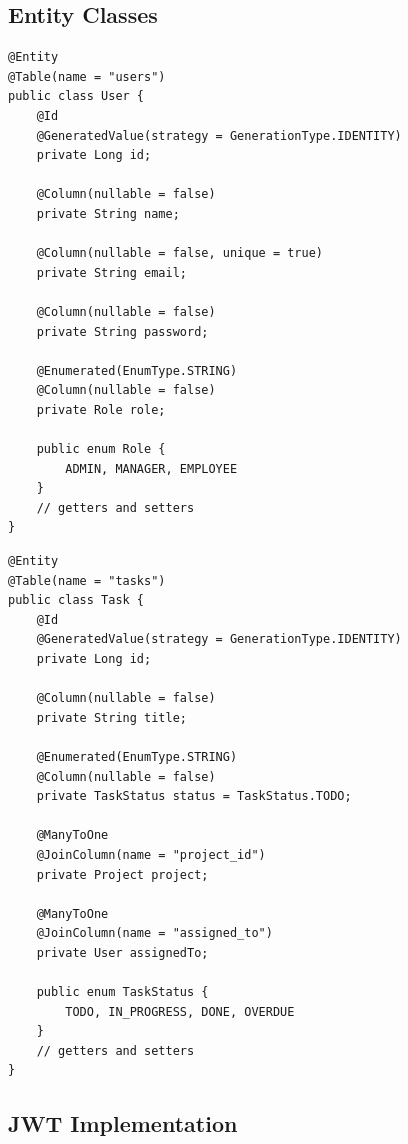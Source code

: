 \documentclass[12pt,a4paper,twoside]{book}
\begin{document}
\subsection{Entity Classes}

\begin{lstlisting}[style=java]
@Entity
@Table(name = "users")
public class User {
    @Id
    @GeneratedValue(strategy = GenerationType.IDENTITY)
    private Long id;
    
    @Column(nullable = false)
    private String name;
    
    @Column(nullable = false, unique = true)
    private String email;
    
    @Column(nullable = false)
    private String password;
    
    @Enumerated(EnumType.STRING)
    @Column(nullable = false)
    private Role role;
    
    public enum Role {
        ADMIN, MANAGER, EMPLOYEE
    }
    // getters and setters
}
\end{lstlisting}

\begin{lstlisting}[style=java]
@Entity
@Table(name = "tasks")
public class Task {
    @Id
    @GeneratedValue(strategy = GenerationType.IDENTITY)
    private Long id;
    
    @Column(nullable = false)
    private String title;
    
    @Enumerated(EnumType.STRING)
    @Column(nullable = false)
    private TaskStatus status = TaskStatus.TODO;
    
    @ManyToOne
    @JoinColumn(name = "project_id")
    private Project project;
    
    @ManyToOne
    @JoinColumn(name = "assigned_to")
    private User assignedTo;
    
    public enum TaskStatus {
        TODO, IN_PROGRESS, DONE, OVERDUE
    }
    // getters and setters
}
\end{lstlisting}

\subsection{JWT Implementation}
\end{document}

